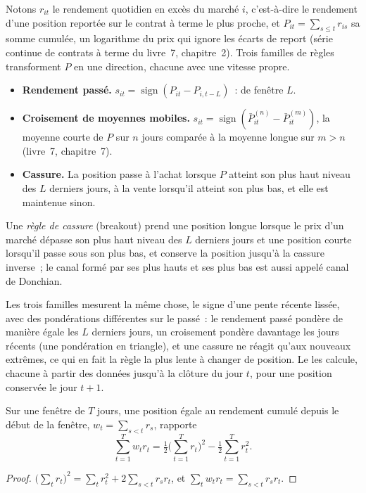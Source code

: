 Notons $r_{it}$ le rendement quotidien en excès du marché $i$, c'est-à-dire le rendement d'une position reportée sur le contrat à terme le plus proche, et $P_{it} =
\sum_{s \le t} r_{is}$ sa somme cumulée, un logarithme du prix qui ignore les écarts de report (série continue de contrats à terme du livre~7, chapitre~2). Trois familles de
règles transforment $P$ en une direction, chacune avec une vitesse propre.
\begin{itemize}
\item \textbf{Rendement passé.} $s_{it} = \operatorname{sign}(P_{it} - P_{i,t-L})$~:  de fenêtre $L$.
\item \textbf{Croisement de moyennes mobiles.} $s_{it} = \operatorname{sign}(\bar P^{(n)}_{it} - \bar P^{(m)}_{it})$, la moyenne courte de $P$ sur $n$ jours
comparée à la moyenne longue sur $m > n$ (livre~7, chapitre~7).
\item \textbf{Cassure.} La position passe à l'achat lorsque $P$ atteint son plus haut niveau des $L$ derniers jours, à la vente lorsqu'il atteint son plus bas, et elle est maintenue sinon.
\end{itemize}

\begin{definition}\label{def:s1:trend-following:breakout}
Une \emph{règle de cassure} (breakout) prend une position longue lorsque le prix d'un marché dépasse son plus haut niveau des $L$ derniers jours et une position courte
lorsqu'il passe sous son plus bas, et conserve la position jusqu'à la cassure inverse~; le canal formé par ses plus hauts et ses plus bas est aussi appelé
canal de Donchian.
\end{definition}

Les trois familles mesurent la même chose, le signe d'une pente récente lissée, avec des pondérations différentes sur le passé~: le rendement passé pondère de manière égale les $L$ derniers jours,
un croisement pondère davantage les jours récents (une pondération en triangle), et une cassure ne réagit qu'aux nouveaux extrêmes, ce qui en fait la règle la plus lente à changer de position.
Le  les calcule, chacune à partir des données jusqu'à la clôture du jour $t$, pour une position conservée le jour $t + 1$.

\begin{proposition}\label{prop:s1:trend-following:convex}
Sur une fenêtre de $T$ jours, une position égale au rendement cumulé depuis le début de la fenêtre, $w_t = \sum_{s < t} r_s$, rapporte
\[
\sum_{t=1}^{T} w_t r_t = \tfrac12\Big(\sum_{t=1}^{T} r_t\Big)^2 - \tfrac12 \sum_{t=1}^{T} r_t^2 .
\]
\end{proposition}
\begin{proof}
$\big(\sum_t r_t\big)^2 = \sum_t r_t^2 + 2\sum_{s < t} r_s r_t$, et $\sum_t w_t r_t = \sum_{s < t} r_s r_t$.
\end{proof}

